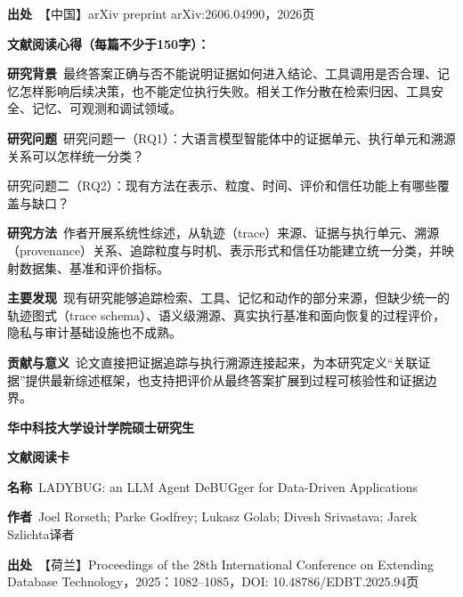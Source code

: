 \noindent\textbf{出处}\ 【中国】arXiv preprint arXiv:2606.04990，2026\quad 页\par
\vspace{0.35em}
\noindent\textbf{文献阅读心得（每篇不少于150字）：}\par
\noindent\textbf{研究背景}\ 最终答案正确与否不能说明证据如何进入结论、工具调用是否合理、记忆怎样影响后续决策，也不能定位执行失败。相关工作分散在检索归因、工具安全、记忆、可观测和调试领域。\par
\noindent\textbf{研究问题}\ 研究问题一（RQ1）：大语言模型智能体中的证据单元、执行单元和溯源关系可以怎样统一分类？\par
研究问题二（RQ2）：现有方法在表示、粒度、时间、评价和信任功能上有哪些覆盖与缺口？\par
\noindent\textbf{研究方法}\ 作者开展系统性综述，从轨迹（trace）来源、证据与执行单元、溯源（provenance）关系、追踪粒度与时机、表示形式和信任功能建立统一分类，并映射数据集、基准和评价指标。\par
\noindent\textbf{主要发现}\ 现有研究能够追踪检索、工具、记忆和动作的部分来源，但缺少统一的轨迹图式（trace schema）、语义级溯源、真实执行基准和面向恢复的过程评价，隐私与审计基础设施也不成熟。\par
\noindent\textbf{贡献与意义}\ 论文直接把证据追踪与执行溯源连接起来，为本研究定义“关联证据”提供最新综述框架，也支持把评价从最终答案扩展到过程可核验性和证据边界。\par
\clearpage
\begin{center}
{\songti\bfseries\fontsize{18.5pt}{27.75pt}\selectfont 华中科技大学设计学院硕士研究生\par}
{\songti\bfseries\fontsize{18.5pt}{27.75pt}\selectfont 文献阅读卡\par}
\end{center}
\vspace{0.25em}
\noindent\underline{}\par
\vspace{0.35em}
\noindent\textbf{名称}\ LADYBUG: an LLM Agent DeBUGger for Data-Driven Applications\par
\noindent\textbf{作者}\ Joel Rorseth; Parke Godfrey; Lukasz Golab; Divesh Srivastava; Jarek Szlichta\quad 译者\par
\noindent\textbf{出处}\ 【荷兰】Proceedings of the 28th International Conference on Extending Database Technology，2025：1082–1085，DOI: 10.48786/EDBT.2025.94\quad 页\par
\vspace{0.35em}
